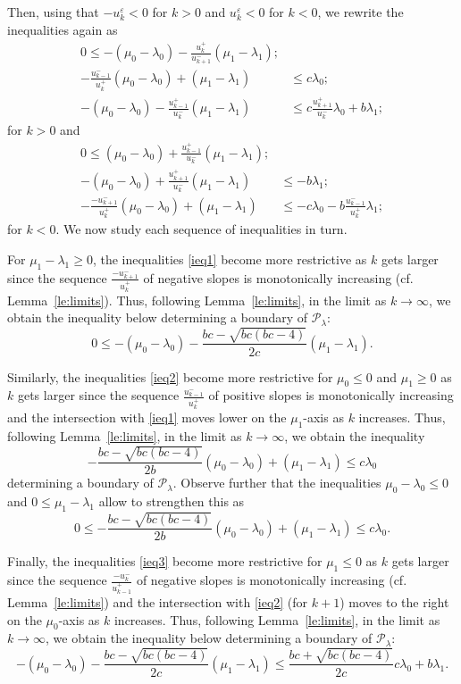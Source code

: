 \documentclass[pdflatex,sn-mathphys]{sn-jnl}%
\theoremstyle{thmstyleone}%
\theoremstyle{thmstyletwo}%
\theoremstyle{thmstylethree}%
\newcommand{\cP}{\mathcal{P}}
\begin{document}
  Then, using that $-u_k^\varepsilon<0$ for $k>0$ and $u_k^\varepsilon<0$ for $k<0$, we rewrite the inequalities again as
  \begin{align}
    \label{ieq1} 0 \le -(\mu_0-\lambda_0)-\frac{u_k^+}{u_{k+1}^-}(\mu_1-\lambda_1); & \\
    \label{ieq2} -\frac{u_{k-1}^-}{u_k^+}(\mu_0-\lambda_0)+(\mu_1-\lambda_1) & \le c\lambda_0;\\
    \label{ieq3} -(\mu_0-\lambda_0)-\frac{u_{k-1}^+}{u_k^-}(\mu_1-\lambda_1) &\le c\frac{u_{k+1}^+}{u_k^-}\lambda_0+b\lambda_1;
  \end{align}
  for $k>0$ and
  \begin{align}
    \label{ieq4} 0 \le (\mu_0-\lambda_0)+\frac{u_{k-1}^+}{u_k^-}(\mu_1-\lambda_1); & \\
    \label{ieq5} -(\mu_0-\lambda_0)+\frac{u_{k+1}^+}{u_k^-}(\mu_1-\lambda_1) &\le -b\lambda_1;\\
    \label{ieq6} -\frac{-u_{k+1}^-}{u_k^+}(\mu_0-\lambda_0)+(\mu_1-\lambda_1) &\le -c\lambda_0-b\frac{u_{k-1}^-}{u_k^+}\lambda_1;
  \end{align}
  for $k<0$.
  We now study each sequence of inequalities in turn.

  For $\mu_1-\lambda_1\ge 0$, the inequalities \eqref{ieq1} become more restrictive as $k$ gets larger since the sequence $\frac{-u_{k+1}^-}{u_k^+}$ of negative slopes is monotonically increasing (cf. Lemma~\ref{le:limits}).
  Thus, following Lemma~\ref{le:limits}, in the limit as $k\to\infty$, we obtain the inequality below determining a boundary of $\cP_\lambda$:
  \[ 0 \le -(\mu_0-\lambda_0)-\frac{bc-\sqrt{bc(bc-4)}}{2c}(\mu_1-\lambda_1). \]

  Similarly, the inequalities \eqref{ieq2} become more restrictive for $\mu_0\le0$ and $\mu_1\ge0$ as $k$ gets larger since the sequence $\frac{u_{k-1}^-}{u_k^+}$ of positive slopes is monotonically increasing and the intersection with \eqref{ieq1} moves lower on the $\mu_1$-axis as $k$ increases.
  Thus, following Lemma~\ref{le:limits}, in the limit as $k\to\infty$, we obtain the inequality
  \[ -\frac{bc-\sqrt{bc(bc-4)}}{2b}(\mu_0-\lambda_0)+(\mu_1-\lambda_1) \le c\lambda_0 \]
  determining a boundary of $\cP_\lambda$.
  Observe further that the inequalities $\mu_0-\lambda_0 \le 0$ and $0 \le \mu_1-\lambda_1$ allow to strengthen this as
  \[ 0 \le -\frac{bc-\sqrt{bc(bc-4)}}{2b}(\mu_0-\lambda_0)+(\mu_1-\lambda_1) \le c\lambda_0. \]

  Finally, the inequalities \eqref{ieq3} become more restrictive for $\mu_1\le0$ as $k$ gets larger since the sequence $\frac{-u_k^-}{u_{k-1}^+}$ of negative slopes is monotonically increasing (cf. Lemma~\ref{le:limits}) and the intersection with \eqref{ieq2} (for $k+1$) moves to the right on the $\mu_0$-axis as $k$ increases.
  Thus, following Lemma~\ref{le:limits}, in the limit as $k\to\infty$, we obtain the inequality below determining a boundary of $\cP_\lambda$:
  \[ -(\mu_0-\lambda_0)-\frac{bc-\sqrt{bc(bc-4)}}{2c}(\mu_1-\lambda_1) \le \frac{bc+\sqrt{bc(bc-4)}}{2c}c\lambda_0+b\lambda_1. \]
\end{document}
